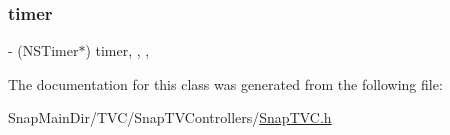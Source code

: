 \subsubsection{\texorpdfstring{timer}{timer}}
{\footnotesize\ttfamily -\/ (N\+S\+Timer$\ast$) timer\hspace{0.3cm}{\ttfamily [read]}, {\ttfamily [write]}, {\ttfamily [nonatomic]}, {\ttfamily [retain]}}



The documentation for this class was generated from the following file\+:\begin{DoxyCompactItemize}
\item 
Snap\+Main\+Dir/\+T\+V\+C/\+Snap\+T\+V\+Controllers/\hyperlink{_snap_t_v_c_8h}{Snap\+T\+V\+C.\+h}\end{DoxyCompactItemize}
